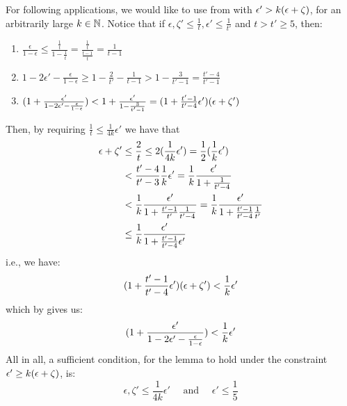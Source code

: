         \begin{remark}[Remark 5.13.1] \label{rmk:value_for_equitable_partition_of_excellent_parts}
            For following applications, we would like to use  from
             with $\epsilon' > k ( \epsilon + \zeta )$, for an arbitrarily large $k \in \mathbb{N}$.
            Notice that if $\epsilon, \zeta' \leq \frac{1}{t}, \epsilon' \leq \frac{1}{t'}$ and $t > t' \geq 5$, then:
            \begin{enumerate}[label=(\alph*), ref=\alph*]
                \item $\frac{\epsilon}{1-\epsilon} \leq \frac{\frac{1}{t}}{1-\frac{1}{t}} = \frac{\frac{1}{t}}{\frac{t-1}{t}}
                    = \frac{1}{t-1}$
                \item $1 - 2 \epsilon' - \frac{\epsilon}{1-\epsilon} \geq 1 - \frac{2}{t'} - \frac{1}{t-1} > 1 - \frac{3}{t'-1}
                    = \frac{t'-4}{t'-1}$
                \item \label{itm:value_for_equitable_partition_of_excellent_parts.c} $( 1 + \frac{\epsilon'}{1 - 2 \epsilon' - \frac{\epsilon}{1-\epsilon}} )
                    < 1 + \frac{\epsilon'}{1 - \frac{3}{t'-1}}
                    = ( 1 + \frac{t'-1}{t'-4} \epsilon' ) ( \epsilon + \zeta' )$
            \end{enumerate}
            Then, by requiring $\frac{1}{t} \leq \frac{1}{4k}\epsilon'$ we have that
            \begin{align*}
                \epsilon + \zeta'
                    & \leq \frac{2}{t} \leq 2 ( \frac{1}{4k}\epsilon' ) = \frac{1}{2} ( \frac{1}{k}\epsilon' ) \\
                    & < \frac{t'-4}{t'- 3} \frac{1}{k} \epsilon' = \frac{1}{k} \frac{\epsilon'}{1 + \frac{1}{t'-4}} \\
                    & < \frac{1}{k} \frac{\epsilon'}{1 + \frac{t'-1}{t'}\frac{1}{t'-4}} = \frac{1}{k} \frac{\epsilon'}{1 + \frac{t'-1}{t'-4}\frac{1}{t'}} \\
                    & \leq \frac{1}{k} \frac{\epsilon'}{1 + \frac{t'-1}{t'-4}\epsilon'}
            \end{align*}
            i.e., we have:
            \[
                ( 1 + \frac{t'-1}{t'-4} \epsilon' ) ( \epsilon + \zeta' ) < \frac{1}{k} \epsilon'
            \]
            which by  gives us:
            \[
                ( 1 + \frac{\epsilon'}{1 - 2 \epsilon' - \frac{\epsilon}{1-\epsilon}} ) < \frac{1}{k} \epsilon'
            \]
            All in all, a sufficient condition, for the lemma to hold under the constraint $\epsilon' \geq k ( \epsilon + \zeta )$, is:
            \[
                \epsilon, \zeta' \leq \frac{1}{4k} \epsilon' \quad \text{ and } \quad \epsilon' \leq \frac{1}{5}
            \]
        \end{remark}

